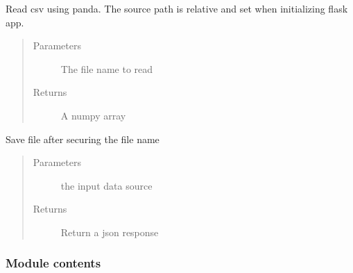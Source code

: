 \documentclass[letterpaper,10pt,english]{sphinxmanual}
\begin{document}
\begin{fulllineitems}
\label{\detokenize{cloudmesh.analytics:cloudmesh.analytics.file_helpers.read_csv}}
Read csv using panda. The source path is relative and set when initializing flask app.
\begin{quote}\begin{description}
\item[{Parameters}] \leavevmode
{} \textendash{} The file name to read

\item[{Returns}] \leavevmode
A numpy array

\end{description}\end{quote}

\end{fulllineitems}


\begin{fulllineitems}
\label{\detokenize{cloudmesh.analytics:cloudmesh.analytics.file_helpers.save}}
Save file after securing the file name
\begin{quote}\begin{description}
\item[{Parameters}] \leavevmode
{} \textendash{} the input data source

\item[{Returns}] \leavevmode
Return a json response

\end{description}\end{quote}

\end{fulllineitems}



\subsubsection{Module contents}
\label{\detokenize{cloudmesh.analytics:module-cloudmesh.analytics}}\label{\detokenize{cloudmesh.analytics:module-contents}}
\end{document}
